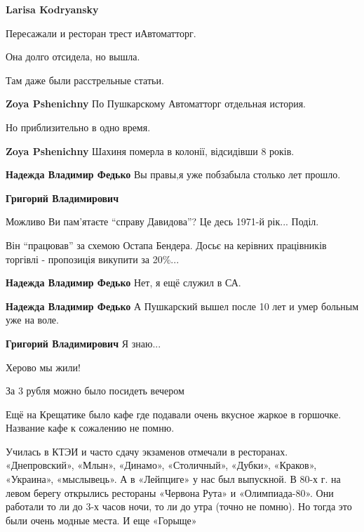 \begin{itemize}
\begin{itemize}
\textbf{Larisa Kodryansky} 

Пересажали и ресторан трест иАвтоматторг.

Она долго отсидела, но вышла.

Там даже были расстрельные статьи.

\begin{itemize} %
\textbf{Zoya Pshenichny} По Пушкарскому Автоматторг отдельная история.

Но приблизительно в одно время.

\textbf{Zoya Pshenichny} Шахиня померла в колонії, відсидівши 8 років.

\textbf{Надежда Владимир Федько} Вы правы,я уже побзабыла столько лет прошло.

\textbf{Григорий Владимирович} 

Можливо Ви пам'ятаєте \enquote{справу Давидова}? Це десь 1971-й рік... Поділ.

Він \enquote{працював} за схемою Остапа Бендера. Досьє на керівних працівників
торгівлі - пропозиція викупити за 20\%...

\textbf{Надежда Владимир Федько} Нет, я ещё служил в СА.

\textbf{Надежда Владимир Федько} А Пушкарский вышел после 10 лет и умер больным уже на воле.

\textbf{Григорий Владимирович} Я знаю...
\end{itemize} %

\end{itemize} %

Херово мы жили!

За 3 рубля можно было посидеть вечером


Ещё на Крещатике было кафе где подавали очень вкусное жаркое в горшочке.
Название кафе к сожалению не помню.


Училась в КТЭИ и часто сдачу экзаменов отмечали в ресторанах. «Днепровский»,
«Млын», «Динамо», «Столичный», «Дубки», «Краков», «Украина», «мыслывець». А в
«Лейпциге» у нас был выпускной. В 80-х г. на левом берегу открылись рестораны
«Червона Рута» и «Олимпиада-80». Они работали то ли до 3-х часов ночи, то ли до
утра (точно не помню). Но тогда это были очень модные места. И еще «Горыще»


\end{itemize}
